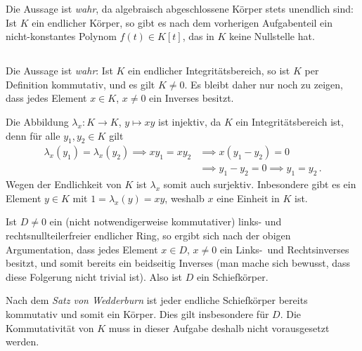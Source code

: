 Die Aussage ist \emph{wahr}, da algebraisch abgeschlossene Körper stets unendlich sind:
Ist $K$ ein endlicher Körper, so gibt es nach dem vorherigen Aufgabenteil ein nicht-konstantes Polynom $f(t) \in K[t]$, das in $K$ keine Nullstelle hat.





\subsection{}

Die Aussage ist \emph{wahr}:
Ist $K$ ein endlicher Integritätsbereich, so ist $K$ per Definition kommutativ, und es gilt $K \neq 0$.
Es bleibt daher nur noch zu zeigen, dass jedes Element $x \in K$, $x \neq 0$ ein Inverses besitzt.

Die Abbildung $\lambda_x \colon K \to K$, $y \mapsto xy$ ist injektiv, da $K$ ein Integritätsbereich ist, denn für alle $y_1, y_2 \in K$ gilt
\begin{align*}
            \lambda_x(y_1) = \lambda_x(y_2)
   \implies x y_1 = x y_2
  &\implies x (y_1 - y_2) = 0 \\
  &\implies y_1 - y_2 = 0
   \implies y_1 = y_2 \,.
\end{align*}
Wegen der Endlichkeit von $K$ ist $\lambda_x$ somit auch surjektiv.
Inbesondere gibt es ein Element $y \in K$ mit $1 = \lambda_x(y) = xy$, weshalb $x$ eine Einheit in $K$ ist.

\begin{remark}
  Ist $D \neq 0$ ein (nicht notwendigerweise kommutativer) links- und rechtsnullteilerfreier endlicher Ring, so ergibt sich nach der obigen Argumentation, dass jedes Element $x \in D$, $x \neq 0$ ein Links-\ und Rechtsinverses besitzt, und somit bereits ein beidseitig Inverses (man mache sich bewusst, dass diese Folgerung nicht trivial ist).
  Also ist $D$ ein Schiefkörper.
  
  Nach dem \emph{Satz von Wedderburn} ist jeder endliche Schiefkörper bereits kommutativ und somit ein Körper.
  Dies gilt insbesondere für $D$.
  Die Kommutativität von $K$ muss in dieser Aufgabe deshalb nicht vorausgesetzt werden.
\end{remark}





